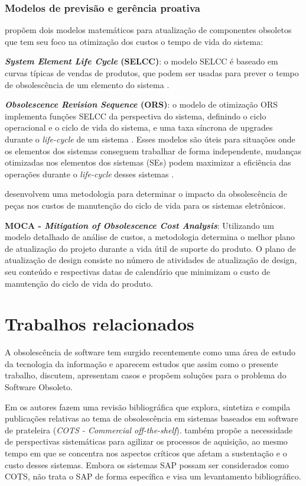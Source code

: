 \subsubsection{\esp Modelos de previsão e gerência proativa}

 propõem dois modelos matemáticos para atualização de componentes obsoletos que tem seu foco na otimização dos custos o tempo de vida do sistema:

\textbf{\textit{System Element Life Cycle} (SELCC)}: o modelo SELCC é baseado em curvas típicas de vendas de produtos, que podem ser usadas para prever o tempo de obsolescência de um elemento do sistema \cite{herald2012}.

\textbf{\textit{Obsolescence Revision Sequence} (ORS)}: o modelo de otimização ORS implementa funções SELCC da perspectiva do sistema, definindo o ciclo operacional e o ciclo de vida do sistema, e uma taxa síncrona de upgrades durante o \textit{life-cycle} de um sistema \cite{herald2012}.
Esses modelos são úteis para situações onde os elementos dos sistemas conseguem trabalhar de forma independente, mudanças otimizadas nos elementos dos sistemas (SEs) podem maximizar a eficiência das operações durante o \textit{life-cycle} desses sistemas \cite{herald2012}.

 desenvolvem uma metodologia para determinar o impacto da obsolescência de peças nos custos de manutenção do ciclo de vida para os sistemas eletrônicos. 

\textbf{MOCA - \textit{Mitigation of Obsolescence Cost Analysis}}:  Utilizando um modelo detalhado de análise de custos, a metodologia determina o melhor
plano de atualização do projeto durante a vida útil de suporte do produto. O plano de atualização de design consiste no número de atividades de atualização de design, seu conteúdo e respectivas datas de calendário que minimizam o custo de manutenção do ciclo de vida do produto.

\section{\esp Trabalhos relacionados}
A obsolescência de software tem surgido recentemente como uma área de estudo da tecnologia da informação e aparecem estudos que assim como o presente trabalho, discutem, apresentam casos e propõem soluções para o problema do Software Obsoleto.

Em  os autores fazem uma revisão bibliográfica que explora, sintetiza e compila publicações relativas ao tema de obsolescência em sistemas baseados em software de prateleira (\textit{COTS - Commercial off-the-shelf}).  também propõe a necessidade de perspectivas sistemáticas para agilizar os processos de aquisição, ao mesmo tempo em que se concentra nos aspectos críticos que afetam a sustentação e o custo desses sistemas. Embora os sistemas SAP possam ser considerados como COTS,  não trata o SAP de forma específica e visa um levantamento bibliográfico.

